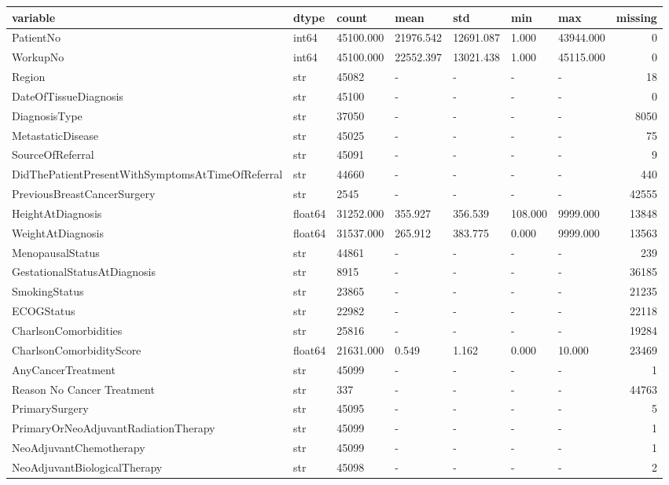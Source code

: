 \begin{tabular}{lllllllr}
\toprule
variable & dtype & count & mean & std & min & max & missing \\
\midrule
PatientNo & int64 & 45100.000 & 21976.542 & 12691.087 & 1.000 & 43944.000 & 0 \\
WorkupNo & int64 & 45100.000 & 22552.397 & 13021.438 & 1.000 & 45115.000 & 0 \\
Region & str & 45082 & - & - & - & - & 18 \\
DateOfTissueDiagnosis & str & 45100 & - & - & - & - & 0 \\
DiagnosisType & str & 37050 & - & - & - & - & 8050 \\
MetastaticDisease & str & 45025 & - & - & - & - & 75 \\
SourceOfReferral & str & 45091 & - & - & - & - & 9 \\
DidThePatientPresentWithSymptomsAtTimeOfReferral & str & 44660 & - & - & - & - & 440 \\
PreviousBreastCancerSurgery & str & 2545 & - & - & - & - & 42555 \\
HeightAtDiagnosis & float64 & 31252.000 & 355.927 & 356.539 & 108.000 & 9999.000 & 13848 \\
WeightAtDiagnosis & float64 & 31537.000 & 265.912 & 383.775 & 0.000 & 9999.000 & 13563 \\
MenopausalStatus & str & 44861 & - & - & - & - & 239 \\
GestationalStatusAtDiagnosis & str & 8915 & - & - & - & - & 36185 \\
SmokingStatus & str & 23865 & - & - & - & - & 21235 \\
ECOGStatus & str & 22982 & - & - & - & - & 22118 \\
CharlsonComorbidities & str & 25816 & - & - & - & - & 19284 \\
CharlsonComorbidityScore & float64 & 21631.000 & 0.549 & 1.162 & 0.000 & 10.000 & 23469 \\
AnyCancerTreatment & str & 45099 & - & - & - & - & 1 \\
Reason No Cancer Treatment & str & 337 & - & - & - & - & 44763 \\
PrimarySurgery & str & 45095 & - & - & - & - & 5 \\
PrimaryOrNeoAdjuvantRadiationTherapy & str & 45099 & - & - & - & - & 1 \\
NeoAdjuvantChemotherapy & str & 45099 & - & - & - & - & 1 \\
NeoAdjuvantBiologicalTherapy & str & 45098 & - & - & - & - & 2 \\

\end{tabular}
